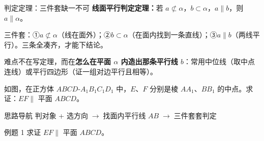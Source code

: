 \documentclass{exam-zh}
\begin{document}
\clearpage
{}


\begin{eduSolutionBox}{判定定理：三件套缺一不可}
  \begingroup
  \setlength{\parskip}{2.5mm}
\textbf{线面平行判定定理：}若 $a\not\subset\alpha$，$b\subset\alpha$，$a\parallel b$，则 $a\parallel\alpha$。\par
三件套：①$ a\not\subset\alpha $（线在面外）；②$ b\subset\alpha $（在面内找到一条直线）；③$ a\parallel b $（两线平行）。三条全凑齐，才能下结论。\par
难点不在写定理，而在\textbf{怎么在平面 $\alpha$ 内造出那条平行线 $b$}：常用中位线（取中点连线）或平行四边形（证一组对边平行且相等）。\par
  \endgroup
\end{eduSolutionBox}




\begin{eduProblemBlock}[例题 1]
如图，在正方体 $ABCD$-$A_{1}B_{1}C_{1}D_{1}$ 中，$E$、$F$ 分别是棱 $AA_{1}$、$BB_{1}$ 的中点。求证：$EF\parallel$ 平面 $ABCD$。

\end{eduProblemBlock}





\begin{eduAuxItem}{思路导航}
判对象 + 选方向$\;\to\;$找面内平行线 $AB$$\;\to\;$三件套套判定\end{eduAuxItem}




\begin{eduSubQuestionItem}{例题 1}
求证 $EF\parallel$ 平面 $ABCD$。\end{eduSubQuestionItem}

\begin{eduDualExplain}
  \begin{eduExplainLeft}
  \end{eduExplainLeft}

  \begin{eduExplainRight}
  \end{eduExplainRight}
\end{eduDualExplain}
\end{document}
